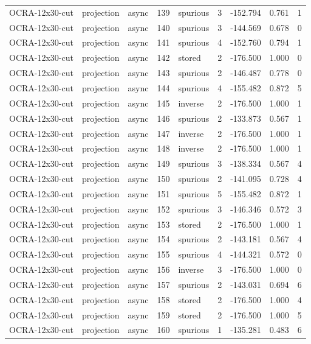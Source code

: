 \begin{tabular}{lllrlrrrr}
OCRA-12x30-cut & projection & async & 139 & spurious & 3 & -152.794 & 0.761 & 1 \\
OCRA-12x30-cut & projection & async & 140 & spurious & 3 & -144.569 & 0.678 & 0 \\
OCRA-12x30-cut & projection & async & 141 & spurious & 4 & -152.760 & 0.794 & 1 \\
OCRA-12x30-cut & projection & async & 142 & stored & 2 & -176.500 & 1.000 & 0 \\
OCRA-12x30-cut & projection & async & 143 & spurious & 2 & -146.487 & 0.778 & 0 \\
OCRA-12x30-cut & projection & async & 144 & spurious & 4 & -155.482 & 0.872 & 5 \\
OCRA-12x30-cut & projection & async & 145 & inverse & 2 & -176.500 & 1.000 & 1 \\
OCRA-12x30-cut & projection & async & 146 & spurious & 2 & -133.873 & 0.567 & 1 \\
OCRA-12x30-cut & projection & async & 147 & inverse & 2 & -176.500 & 1.000 & 1 \\
OCRA-12x30-cut & projection & async & 148 & inverse & 2 & -176.500 & 1.000 & 1 \\
OCRA-12x30-cut & projection & async & 149 & spurious & 3 & -138.334 & 0.567 & 4 \\
OCRA-12x30-cut & projection & async & 150 & spurious & 2 & -141.095 & 0.728 & 4 \\
OCRA-12x30-cut & projection & async & 151 & spurious & 5 & -155.482 & 0.872 & 1 \\
OCRA-12x30-cut & projection & async & 152 & spurious & 3 & -146.346 & 0.572 & 3 \\
OCRA-12x30-cut & projection & async & 153 & stored & 2 & -176.500 & 1.000 & 1 \\
OCRA-12x30-cut & projection & async & 154 & spurious & 2 & -143.181 & 0.567 & 4 \\
OCRA-12x30-cut & projection & async & 155 & spurious & 4 & -144.321 & 0.572 & 0 \\
OCRA-12x30-cut & projection & async & 156 & inverse & 3 & -176.500 & 1.000 & 0 \\
OCRA-12x30-cut & projection & async & 157 & spurious & 2 & -143.031 & 0.694 & 6 \\
OCRA-12x30-cut & projection & async & 158 & stored & 2 & -176.500 & 1.000 & 4 \\
OCRA-12x30-cut & projection & async & 159 & stored & 2 & -176.500 & 1.000 & 5 \\
OCRA-12x30-cut & projection & async & 160 & spurious & 1 & -135.281 & 0.483 & 6 \\

\end{tabular}
